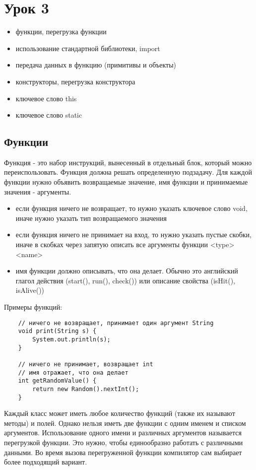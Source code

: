 \section*{Урок 3}
\begin{itemize} 
	\item функции, перегрузка функции
	\item использование стандартной библиотеки, import
	\item передача данных в функцию (примитивы и объекты)
	\item конструкторы, перегрузка конструктора
	\item ключевое слово this
	\item ключевое слово static
\end{itemize}

	


\subsection*{Функции}
Функция - это набор инструкций, вынесенный в отдельный блок, который можно переиспользовать. Функция должна решать определенную подзадачу. Для каждой функции нужно объявить возвращаемые значение, имя функции и принимаемые значения - аргументы. 
\begin{itemize}
	\item если функция ничего не возвращает, то нужно указать ключевое слово void, иначе нужно указать тип возвращаемого значения
	\item если функция ничего не принимает на вход, то нужно указать пустые скобки, иначе в скобках через запятую описать все аргументы функции <type> <name>
	\item имя функции должно описывать, что она делает. Обычно это английский глагол действия (start(), run(), check()) или описание свойства (isHit(), isAlive())


\end{itemize}

Примеры функций:
\begin{lstlisting}
	// ничего не возвращает, принимает один аргумент String
	void print(String s) {
		System.out.println(s);
	}

	// ничего не принимает, возвращает int
	// имя отражает, что она делает
	int getRandomValue() {
		return new Random().nextInt();
	}
\end{lstlisting}

Каждый класс может иметь любое количество функций (также их называют методы) и полей. Однако нельзя иметь две функции с одним именем и списком аргументов. Использование одного имени и различных аргументов называется перегрузкой функции. Это нужно, чтобы единообразно работать с различными данными. Во время вызова перегруженной функции компилятор сам выбирает более подходящий вариант.

